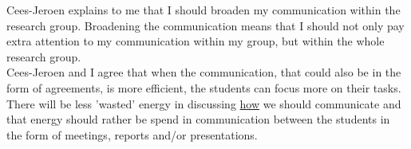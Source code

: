 \documentclass[11pt]{article}
\begin{document}
	Cees-Jeroen explains to me that I should broaden my communication within the research group. Broadening the communication means that I should not only pay extra attention to my communication within my group, but within the whole research group.\\
	
	Cees-Jeroen and I agree that when the communication, that could also be in the form of agreements, is more efficient, the students can focus more on their tasks.\\
	
	There will be less 'wasted' energy in discussing \underline{how} we should communicate and that energy should rather be spend in communication between the students in the form of meetings, reports and/or presentations.
	
	
	\newpage
	\printbibliography
	
\end{document}

